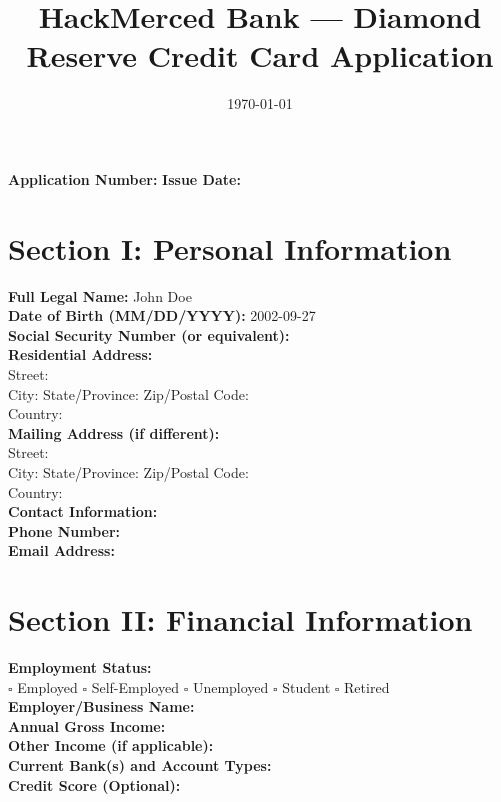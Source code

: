 \documentclass[12pt,a4paper]{article}
\begin{document}
\title{\textbf{HackMerced Bank --- Diamond Reserve Credit Card Application}}
\author{}
\date{\today}
\maketitle

\thispagestyle{empty}

\begin{center}
\textbf{Application Number:} \underline{\hspace{2in}} \hspace{1cm}
\textbf{Issue Date:} \underline{\hspace{1.5in}}
\end{center}

\vspace{1cm}

\section*{Section I: Personal Information}
\noindent\textbf{Full Legal Name:} John Doe\\[1ex]
\textbf{Date of Birth (MM/DD/YYYY):} 2002-09-27\\[1ex]
\textbf{Social Security Number (or equivalent):} \\[1ex]
\textbf{Residential Address:}\\
\quad Street: \\[1ex]
\quad City:  \quad State/Province:  \quad Zip/Postal Code: \\[1ex]
\quad Country: \\[2ex]
\textbf{Mailing Address (if different):}\\
\quad Street: \\[1ex]
\quad City:  \quad State/Province:  \quad Zip/Postal Code: \\[1ex]
\quad Country: \\[2ex]
\textbf{Contact Information:}\\[1ex]
\quad \textbf{Phone Number:} \\[1ex]
\quad \textbf{Email Address:} \\[2ex]

\section*{Section II: Financial Information}
\noindent\textbf{Employment Status:}\\[1ex]
\hspace{0.5cm} $\square$ Employed \hspace{1cm} $\square$ Self-Employed \hspace{1cm} $\square$ Unemployed \hspace{1cm} $\square$ Student \hspace{1cm} $\square$ Retired\\[2ex]
\textbf{Employer/Business Name:} \\[2ex]
\textbf{Annual Gross Income:} \\[2ex]
\textbf{Other Income (if applicable):} \\[2ex]
\textbf{Current Bank(s) and Account Types:} \\[2ex]
\textbf{Credit Score (Optional):} \\[2ex]
\end{document}
